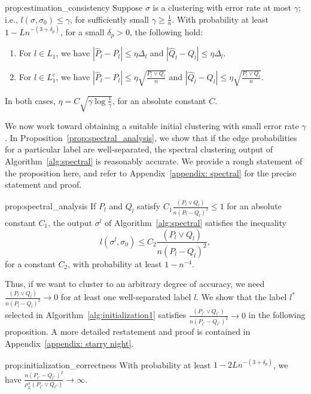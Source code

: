 \documentclass{article}
\begin{document}
\begin{repproposition}{prop:estimation_consistency}
Suppose $\sigma$ is a clustering with error rate at most $\gamma$; i.e., $l(\sigma, \sigma_0) \leq \gamma$, for sufficiently small $\gamma \ge \frac{1}{n}$. With probability at least $1 - L n^{-(3 + \delta_p)}$, for a small $\delta_p > 0$, the following hold:
\begin{enumerate}
\item For $l \in L_1$, we have $| \hat{P}_l - P_l | \leq \eta \Delta_l$ and $| \hat{Q}_l - Q_l | \leq \eta \Delta_l.$
\item For $l \in L_1^c$, we have $| \hat{P}_l - P_l | \leq \eta \sqrt{ \frac{P_l \vee Q_l}{n}}$ and $| \hat{Q}_l - Q_l | \leq \eta \sqrt{ \frac{P_l \vee Q_l}{n}}$.
\end{enumerate}
In both cases,  $\eta = C \sqrt{\gamma \log \frac{1}{\gamma}}$, for an absolute constant $C$.
\end{repproposition}

We now work toward obtaining a suitable initial clustering with small error rate $\gamma$. In Proposition~\ref{prop:spectral_analysis}, we show that if the edge probabilities for a particular label are well-separated, the spectral clustering output of Algorithm~\ref{alg:spectral} is reasonably accurate. We provide a rough statement of the proposition here, and refer to Appendix~\ref{appendix: spectral} for the precise statement and proof.
\begin{repproposition}{prop:spectral_analysis}
If $P_l$ and $Q_l$ satisfy $C_1 \frac{(P_l \vee Q_l)}{n (P_l-Q_l)^2} \leq 1$ for an absolute constant $C_1$,  the output $\sigma^l$ of Algorithm~\ref{alg:spectral} satisfies the inequality
\[
l(\sigma^l, \sigma_0) \leq C_2 \frac{(P_l \vee Q_l)}{n (P_l-Q_l)^2},
\]
for a constant $C_2$, with probability at least $1 - n^{-4}$.
\end{repproposition}
Thus, if we want to cluster to an arbitrary degree of accuracy, we need $ \frac{(P_l \vee Q_l)}{n (P_l-Q_l)^2} \to 0$ for at least one well-separated label $l$. We show that the label $l^*$ selected in Algorithm~\ref{alg:initialization1} satisfies $ \frac{(P_{l^*} \vee Q_{l^*})}{n (P_{l^*}-Q_{l^*})^2} \to 0$ in the following proposition. A more detailed restatement and proof is contained in Appendix~\ref{appendix: starry night}.
\begin{repproposition}{prop:initialization_correctness}
With probability at least $1 - 2L n^{-(3+\delta_p)}$, we have $\frac{n (P_{l^*}-Q_{l^*})^2}{\rho_L^4(P_{l^*} \vee Q_{l^*})} \rightarrow \infty$. 
\end{repproposition}
\end{document}
